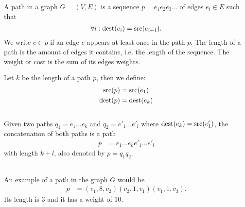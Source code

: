 	\begin{mydef}\label{path}
		A \textnormal{path} in a graph $G = (V, E)$ is a sequence $p = e_1e_2e_3\ldots$ of edges $e_i \in E$ such that
		\begin{align*}
			\forall i: \operatorname{dest}(e_i) = \operatorname{src}(e_{i + 1}).
		\end{align*}
		We write $e \in p$ if an edge $e$ appears at least once in the path $p$.
		The \textnormal{length} of a path is the amount of edges it contains, i.e. the length of the sequence.
		The \textnormal{weight} or \textnormal{cost} is the sum of its edges weights.
		
		Let $k$ be the length of a path $p$, then we define:
		\begin{align*}
			\operatorname{src}(p)	&= \operatorname{src}(e_1)\\
			\operatorname{dest}(p)	&= \operatorname{dest}(e_k)
		\end{align*}\quad\\
		Given two paths $q_1 = e_1\ldots e_k$ and $q_2 = e'_1\ldots e'_l$ where $\operatorname{dest}(e_k) = \operatorname{src}(e'_1)$,
		the concatenation of both paths is a path
		\begin{align*}
			p	&= e_1\ldots e_k e'_1\ldots e'_l
		\end{align*}
		with length $k + l$, also denoted by $p = q_1q_2$.
	\end{mydef}\quad\\
	An example of a path in the graph $G$ would be
	\begin{align*}
		p	&=(v_1, 8, v_2)(v_2, 1, v_1)(v_1, 1, v_3).
	\end{align*}
	Its length is $3$ and it has a weight of $10$.
	
